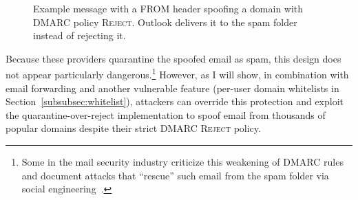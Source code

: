 \begin{figure}[t]
    \centering
{
    \setlength{\fboxsep}{0pt}
    \setlength{\fboxrule}{0.5pt}
}
    \caption[Example of a Spoofed Message]{Example message with a FROM header spoofing a domain with DMARC policy \textsc{Reject}.  Outlook delivers it to the spam folder instead of rejecting it.
    }
    \label{fig:example_ms_not_rejecting}
    \end{figure}

%

Because these providers quarantine the spoofed email as spam, this
design does not appear particularly dangerous.\footnote{Some in the
  mail security industry criticize this weakening of DMARC
  rules and document attacks that ``rescue'' such email from the spam folder via social engineering~\cite{Microsof7:online,Spearphi83:online}.} However, as I
will show, in combination with email forwarding and another
vulnerable feature (per-user domain whitelists in Section~\ref{subsubsec:whitelist}), attackers can override this
protection and exploit the quarantine-over-reject implementation to spoof
email from thousands of popular domains despite their strict
DMARC \textsc{Reject} policy.


